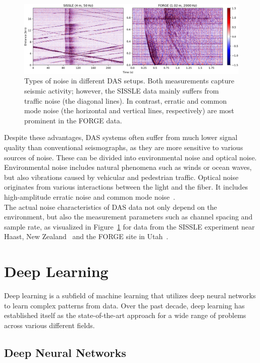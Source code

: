 \begin{figure}[b!]
    \includegraphics[width=\textwidth]{img/fig_2.2.png}
    \caption{
        Types of noise in different DAS setups.
        Both measurements capture seismic activity; however, the SISSLE data mainly suffers from traffic noise
        (the diagonal lines).
        In contrast, erratic and common mode noise (the horizontal and vertical lines,
        respectively) are most prominent in the FORGE data.
    }\label{fig:das-noise}
\end{figure}

Despite these advantages, DAS systems often suffer from much lower signal quality than conventional seismographs, as they are more sensitive to various sources of noise.
These can be divided into environmental noise and optical noise.
Environmental noise includes natural phenomena such as winds or ocean waves, but also vibrations caused by vehicular and pedestrian traffic.
Optical noise originates from various interactions between the light and the fiber.
It includes high-amplitude erratic noise and common mode noise~\cite{IDF}.\\
The actual noise characteristics of DAS data not only depend on the environment, but also the measurement parameters such as channel spacing and sample rate, as visualized in Figure~\ref{fig:das-noise} for data from the SISSLE experiment near Haast, New Zealand~\cite{SISSLE} and the FORGE site in Utah~\cite{FORGE}.

\section{Deep Learning}

Deep learning is a subfield of machine learning that utilizes deep neural networks to learn complex patterns from data. 
Over the past decade, deep learning has established itself as the state-of-the-art approach for a wide range of problems across various different fields.

\subsection{Deep Neural Networks}

